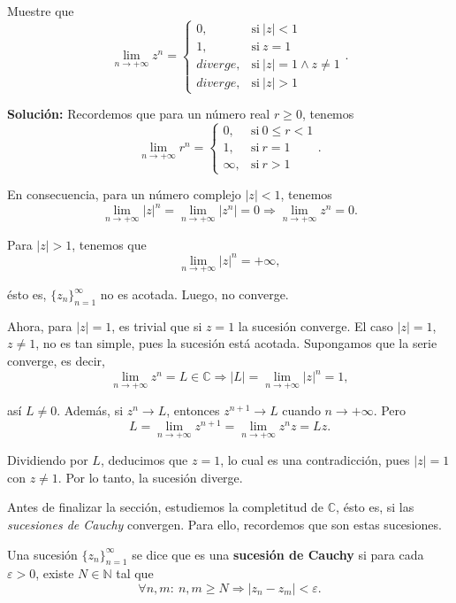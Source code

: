 \begin{ejemplo} \label{EjemploSucesion}
Muestre que
$$\lim_{n\to + \infty} z^n = \left\{ \begin{array}{cl}
    0,& \mbox{si} ~ |z| < 1  \\
    1, &  \mbox{si} ~ z = 1 \\
    diverge, &\mbox{si} ~ |z| = 1 \wedge z \neq 1 \\
    diverge, &\mbox{si} ~ |z| > 1
\end{array} \right. .$$

\textbf{Solución:} Recordemos que para un número real $r \geq 0$, tenemos
$$\lim_{n\to + \infty} r^n = \left\{ \begin{array}{cl}
    0,& \mbox{si} ~ 0\leq r < 1  \\
    1, &  \mbox{si} ~ r = 1 \\
    \infty, &\mbox{si} ~ r > 1
\end{array} \right. .$$


En consecuencia, para un número complejo $|z| < 1$, tenemos 
$$\lim_{n\to + \infty} |z|^n = \lim_{n\to + \infty} |z^n| =   0 \Rightarrow  \lim_{n\to + \infty} z^n = 0.$$

Para $|z| > 1$, tenemos que 
$$\lim_{n\to + \infty} |z|^n = + \infty,$$

ésto es, $\{z_n\}_{n = 1}^{\infty}$ no es acotada. Luego, no converge. 

Ahora, para $|z| = 1$, es trivial que si $z = 1$ la sucesión converge. El caso $|z| = 1$, $z\neq 1$, no es tan simple, pues la sucesión está acotada. Supongamos que la serie converge, es decir,
$$\lim_{n\to + \infty} z^n = L \in \mathbb{C} \Rightarrow |L| = \lim_{n\to + \infty} |z|^n = 1,$$

así $L \neq 0$. Además, si $z^n \to L$, entonces $z^{n+1} \to L$ cuando $n\to + \infty$. Pero 
$$L = \lim_{n\to + \infty} z^{n+1} = \lim_{n\to + \infty} z^{n}z = Lz.$$

Dividiendo por $L$, deducimos que $z = 1$, lo cual es una contradicción, pues $|z| =1$ con $z \neq 1$. Por lo tanto, la sucesión diverge.
\end{ejemplo}

Antes de finalizar la sección, estudiemos la completitud de $\mathbb{C}$, ésto es, si las \textit{sucesiones de Cauchy} convergen. Para ello, recordemos que son estas sucesiones.

\begin{defi}
Una sucesión $\{z_n\}_{n=1}^{\infty}$ se dice que es una \textbf{sucesión de Cauchy} si para cada $\varepsilon > 0$, existe $N \in \mathbb{N}$ tal que
$$\forall n,m:~ n,m \geq N \Rightarrow |z_n-z_m| < \varepsilon.$$
\end{defi}

